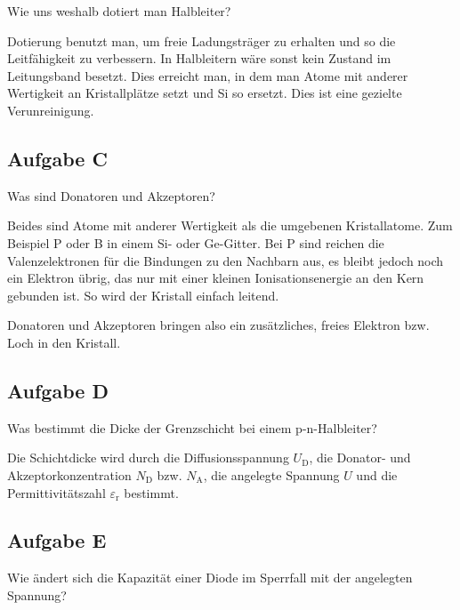 \begin{problem}
	Wie uns weshalb dotiert man Halbleiter?
\end{problem}

Dotierung benutzt man, um freie Ladungsträger zu erhalten und so die
Leitfähigkeit zu verbessern. In Halbleitern wäre sonst kein Zustand im
Leitungsband besetzt. Dies erreicht man, in dem man Atome mit anderer
Wertigkeit an Kristallplätze setzt und Si so ersetzt. Dies ist eine gezielte
Verunreinigung.

\FloatBarrier
\subsection{Aufgabe C}

\begin{problem}
	Was sind Donatoren und Akzeptoren?
\end{problem}

Beides sind Atome mit anderer Wertigkeit als die umgebenen Kristallatome. Zum
Beispiel P oder B in einem Si- oder Ge-Gitter. Bei P sind reichen die
Valenzelektronen für die Bindungen zu den Nachbarn aus, es bleibt jedoch noch
ein Elektron übrig, das nur mit einer kleinen Ionisationsenergie an den Kern
gebunden ist. So wird der Kristall einfach leitend.

Donatoren und Akzeptoren bringen also ein zusätzliches, freies Elektron bzw.
Loch in den Kristall. \cite[§18.4.2]{meschede-gerthsen_24}

\FloatBarrier
\subsection{Aufgabe D}

\begin{problem}
	Was bestimmt die Dicke der Grenzschicht bei einem p-n-Halbleiter?
\end{problem}

Die Schichtdicke wird durch die Diffusionsspannung $U_\text{D}$, die Donator-
und Akzeptorkonzentration $N_\text{D}$ bzw. $N_\text{A}$, die angelegte
Spannung $U$ und die Permittivitätszahl $\varepsilon_\text{r}$ bestimmt.

\FloatBarrier
\subsection{Aufgabe E}

\begin{problem}
	Wie ändert sich die Kapazität einer Diode im Sperrfall mit der angelegten
	Spannung?
\end{problem}

